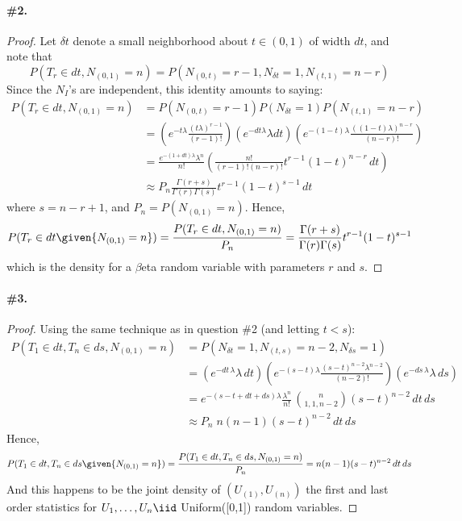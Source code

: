 \documentclass[12pt,titlepage]{article}
\begin{document}
\paragraph{\#2.} 
\begin{proof}
Let $\delta t$ denote a small neighborhood about $t \in (0,1)$ of width $dt$, and note that
\[
P( T_r \in dt , {N_{(0,1)} = n}) = P( N_{(0,t)} = r-1, N_{\delta t}= 1, N_{(t,1)} = n-r)
\]
Since the $N_{I}$'s are independent, this identity amounts to saying:
\begin{align*}
P( T_r \in dt , {N_{(0,1)} = n}) &= P( N_{(0,t)} = r-1) P(N_{\delta t}= 1) P(N_{(t,1)} = n-r) \\
&= \left( e^{-t\lambda} \frac{(t\lambda)^{r-1}}{(r-1)!} \right) \left( e^{-dt\lambda} {\lambda dt} \right) \left( e^{-(1-t)\lambda} \frac{((1-t)\lambda)^{n-r}}{(n-r)!} \right) \\
&=\frac{e^{-(1+dt)\lambda} \lambda^{n}}{n!} \left( \frac{n!}{(r-1)! (n-r)!} t^{r-1} (1-t)^{n-r} \, dt \right) \\
&\approx P_{n} \frac{\Gamma(r+s)}{\Gamma(r) \Gamma(s)} t^{r-1} (1-t)^{s-1} \, dt
\end{align*}
where $s = n-r+1$, and $P_n = P(N_{(0,1)}=n)$. Hence,
\[
P( T_r \in dt \given{N_{(0,1)} = n}) = \frac{P( T_r \in dt , {N_{(0,1)} = n})}{P_n} = \frac{\Gamma(r+s)}{\Gamma(r) \Gamma(s)} t^{r-1} (1-t)^{s-1} 
\]
which is the density for a $\beta$eta random variable with parameters $r$ and $s$. 
\end{proof}
\paragraph{\#3.} 
\begin{proof}
Using the same technique as in question \#2 (and letting $t < s$):
\begin{align*}
P(T_{1} \in dt, T_{n} \in ds, N_{(0,1)} = n) &= P(N_{\delta t} = 1, N_{(t,s)} = n-2, N_{\delta s}=1) \\
&=\left(e^{-dt \, \lambda} \lambda \, dt \right) \left( e^{-(s-t)\lambda} \frac{(s-t)^{n-2} \lambda^{n-2}}{(n-2)!} \right) \left(e^{-ds \, \lambda} \lambda \, ds \right) \\
&= e^{-(s-t + dt + ds)\lambda} \frac{\lambda^n}{n!} \, \binom{n}{1, 1, n-2} (s-t)^{n-2} \, dt \, ds \\
&\approx P_{n} \; n(n-1) (s-t)^{n-2} \, dt \, ds
\end{align*}
Hence, 
\[
P(T_{1} \in dt, T_{n} \in ds \given{N_{(0,1)} = n}) = \frac{P(T_{1} \in dt, T_{n} \in ds, N_{(0,1)} = n)}{P_{n}} = n(n-1)(s-t)^{n-2} \, dt \, ds
\]
And this happens to be the joint density of $(U_{(1)}, U_{(n)})$ the first and last order statistics for $U_1, \ldots, U_n \iid $ Uniform([0,1]) random variables.  
\end{proof}
\end{document}
